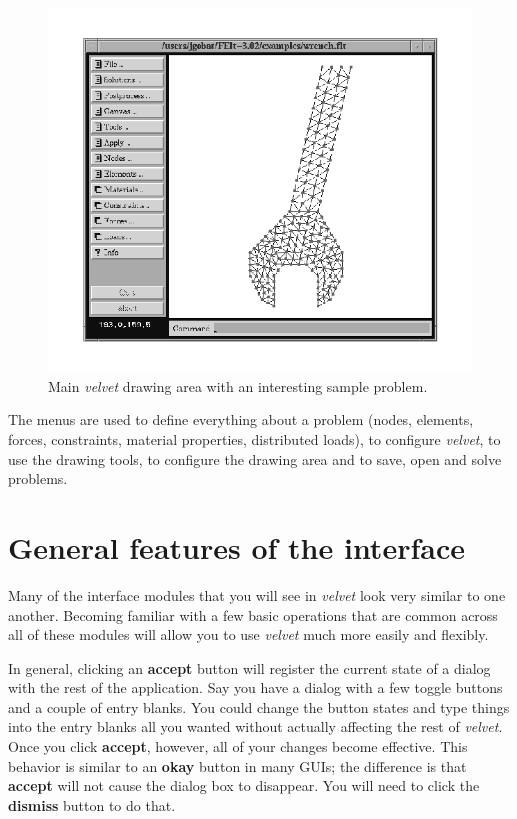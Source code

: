 \begin{figure}
\begin{center}
 \includegraphics[width=6.0in]{figures/velvet_main}
\end{center}
\caption{Main {\em velvet} drawing area with an interesting sample problem.}
\label{velvet.main}
\end{figure}

The menus are used to define everything about a problem (nodes, elements, 
forces, constraints, material properties, distributed loads), to configure 
{\em velvet}, to use the drawing tools, to configure the drawing area and to 
save, open and solve problems.  

\section{General features of the interface}

Many of the interface modules that you will see in {\em velvet} look
very similar to one another.  Becoming familiar with a few basic operations
that are common across all of these modules will allow you to use
{\em velvet} much more easily and flexibly.

In general, clicking an {\bf accept} button will register the current state
of a dialog with the rest of the application.  Say you have a dialog
with a few toggle buttons and a couple of entry blanks. You could
change the button states and type things into the entry blanks all you
wanted without actually affecting the rest of {\em velvet}.  Once you
click {\bf accept}, however, all of your changes become effective.  This
behavior is similar to an {\bf okay} button in many GUIs; the difference
is that {\bf accept} will not cause the dialog box to disappear.  You will
need to click the {\bf dismiss} button to do that.  

